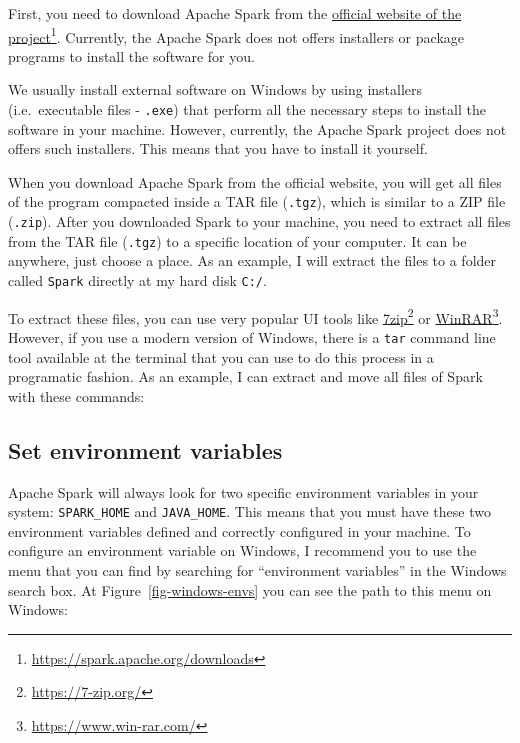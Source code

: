 \documentclass[
  11pt,
  letterpaper,
  DIV=11,
  numbers=noendperiod]{scrreprt}
\newenvironment{Shaded}{\begin{snugshade}}{\end{snugshade}}
\newcommand{\NormalTok}[1]{\textcolor[rgb]{0.00,0.23,0.31}{#1}}
\begin{document}
First, you need to download Apache Spark from the
\href{https://spark.apache.org/downloads}{official website of the
project}\footnote{\url{https://spark.apache.org/downloads}}. Currently,
the Apache Spark does not offers installers or package programs to
install the software for you.

We usually install external software on Windows by using installers
(i.e.~executable files - \texttt{.exe}) that perform all the necessary
steps to install the software in your machine. However, currently, the
Apache Spark project does not offers such installers. This means that
you have to install it yourself.

When you download Apache Spark from the official website, you will get
all files of the program compacted inside a TAR file (\texttt{.tgz}),
which is similar to a ZIP file (\texttt{.zip}). After you downloaded
Spark to your machine, you need to extract all files from the TAR file
(\texttt{.tgz}) to a specific location of your computer. It can be
anywhere, just choose a place. As an example, I will extract the files
to a folder called \texttt{Spark} directly at my hard disk \texttt{C:/}.

To extract these files, you can use very popular UI tools like
\href{https://7-zip.org/}{7zip}\footnote{\url{https://7-zip.org/}} or
\href{https://www.win-rar.com/}{WinRAR}\footnote{\url{https://www.win-rar.com/}}.
However, if you use a modern version of Windows, there is a \texttt{tar}
command line tool available at the terminal that you can use to do this
process in a programatic fashion. As an example, I can extract and move
all files of Spark with these commands:

\begin{Shaded}
\end{Shaded}

\hypertarget{set-environment-variables}{%
\subsection{Set environment variables}\label{set-environment-variables}}

Apache Spark will always look for two specific environment variables in
your system: \texttt{SPARK\_HOME} and \texttt{JAVA\_HOME}. This means
that you must have these two environment variables defined and correctly
configured in your machine. To configure an environment variable on
Windows, I recommend you to use the menu that you can find by searching
for ``environment variables'' in the Windows search box. At
Figure~\ref{fig-windows-envs} you can see the path to this menu on
Windows:
\end{document}

